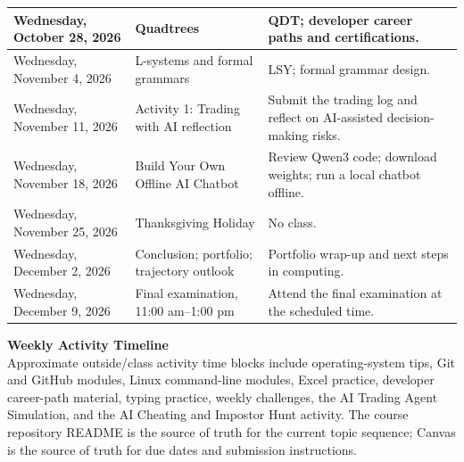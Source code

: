 \documentclass[11pt,letterpaper]{article}
\newcommand{\lefthead}[2]{\noindent\textbf{#1}\hfill\\[#2]}
\begin{document}
\begin{center}
\begin{tabularx}{0.98\textwidth}{|>{\raggedright\arraybackslash}p{}|>{\raggedright\arraybackslash}X|>{\raggedright\arraybackslash}p{}|}
Wednesday, October 28, 2026 & Quadtrees & QDT; developer career paths and certifications. \\ \hline
Wednesday, November 4, 2026 & L-systems and formal grammars & LSY; formal grammar design. \\ \hline
Wednesday, November 11, 2026 & Activity 1: Trading with AI reflection & Submit the trading log and reflect on AI-assisted decision-making risks. \\ \hline
Wednesday, November 18, 2026 & Build Your Own Offline AI Chatbot & Review Qwen3 code; download weights; run a local chatbot offline. \\ \hline
Wednesday, November 25, 2026 & Thanksgiving Holiday & No class. \\ \hline
Wednesday, December 2, 2026 & Conclusion; portfolio; trajectory outlook & Portfolio wrap-up and next steps in computing. \\ \hline
Wednesday, December 9, 2026 & Final examination, 11:00 am--1:00 pm & Attend the final examination at the scheduled time. \\ \hline
\end{tabularx}
\end{center}

\lefthead{Weekly Activity Timeline}{0.3cm}
Approximate outside/class activity time blocks include operating-system tips, Git and GitHub modules, Linux command-line modules, Excel practice, developer career-path material, typing practice, weekly challenges, the AI Trading Agent Simulation, and the AI Cheating and Impostor Hunt activity. The course repository README is the source of truth for the current topic sequence; Canvas is the source of truth for due dates and submission instructions.
\end{document}
